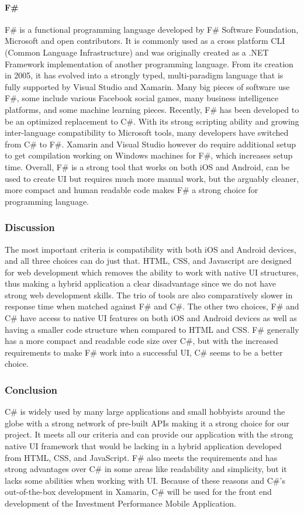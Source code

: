 \documentclass[onecolumn, draftclsnofoot,10pt, compsoc]{IEEEtran}
\begin{document}
\paragraph{F\#}
F\# is a functional programming language developed by F\# Software Foundation, Microsoft and open contributors. It is commonly used as a cross platform CLI (Common Language Infrastructure) and was originally
created as a .NET Framework implementation of another programming language. From its creation in 2005, it has evolved into a strongly typed, multi-paradigm language that is fully supported by Visual Studio and Xamarin.
Many big pieces of software use F\#, some include various Facebook social games, many business intelligence platforms, and some machine learning pieces. Recently, F\# has been developed to be an optimized
replacement to C\#. With its strong scripting ability and growing inter-language compatibility to Microsoft tools, many developers have switched from C\# to F\#. Xamarin and Visual Studio however do require 
additional setup to get compilation working on Windows machines for F\#, which increases setup time. Overall, F\# is a strong tool that works on both iOS and Android, can be used to create UI but requires much more manual
work, but the arguably cleaner, more compact and human readable code makes F\# a strong choice for programming language.

\subsubsection{Discussion}
The most important criteria is compatibility with both iOS and Android devices, and all three choices can do just that. HTML, CSS, and Javascript are designed for web development which removes the ability
to work with native UI structures, thus making a hybrid application a clear disadvantage since we do not have strong web development skills. The trio of tools are also comparatively slower in response time
when matched against F\# and C\#. The other two choices, F\# and C\# have access to native UI features on both iOS and Android devices as well as having a smaller code structure when compared to HTML and CSS.
F\# generally has a more compact and readable code size over C\#, but with the increased requirements to make F\# work into a successful UI, C\# seems to be a better choice. 

\subsubsection{Conclusion}
C\# is widely used by many large applications and small hobbyists around the globe with a strong network of pre-built APIs making it a strong choice for our project. It meets all our criteria and can provide our
application with the strong native UI framework that would be lacking in a hybrid application developed from HTML, CSS, and JavaScript. F\# also meets the requirements and has strong advantages over C\# in some areas
like readability and simplicity, but it lacks some abilities when working with UI. Because of these reasons and C\#'s out-of-the-box development in Xamarin, C\# will be used for the front end development of the
Investment Performance Mobile Application.
\end{document}
